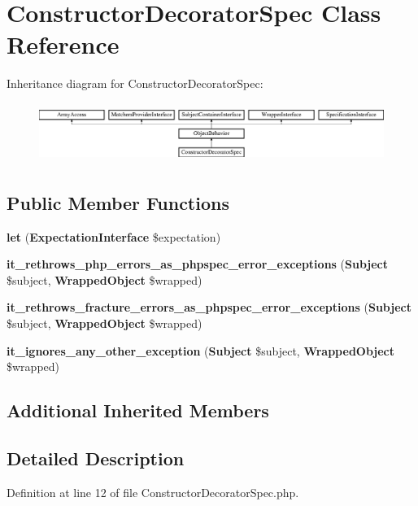 \section{Constructor\+Decorator\+Spec Class Reference}
\label{classspec_1_1_php_spec_1_1_wrapper_1_1_subject_1_1_expectation_1_1_constructor_decorator_spec}
Inheritance diagram for Constructor\+Decorator\+Spec\+:\begin{figure}[H]
\begin{center}
\leavevmode
\includegraphics[height=1.953488cm]{classspec_1_1_php_spec_1_1_wrapper_1_1_subject_1_1_expectation_1_1_constructor_decorator_spec}
\end{center}
\end{figure}
\subsection*{Public Member Functions}
\begin{DoxyCompactItemize}
\item 
{\bf let} ({\bf Expectation\+Interface} \$expectation)
\item 
{\bf it\+\_\+rethrows\+\_\+php\+\_\+errors\+\_\+as\+\_\+phpspec\+\_\+error\+\_\+exceptions} ({\bf Subject} \$subject, {\bf Wrapped\+Object} \$wrapped)
\item 
{\bf it\+\_\+rethrows\+\_\+fracture\+\_\+errors\+\_\+as\+\_\+phpspec\+\_\+error\+\_\+exceptions} ({\bf Subject} \$subject, {\bf Wrapped\+Object} \$wrapped)
\item 
{\bf it\+\_\+ignores\+\_\+any\+\_\+other\+\_\+exception} ({\bf Subject} \$subject, {\bf Wrapped\+Object} \$wrapped)
\end{DoxyCompactItemize}
\subsection*{Additional Inherited Members}


\subsection{Detailed Description}


Definition at line 12 of file Constructor\+Decorator\+Spec.\+php.



